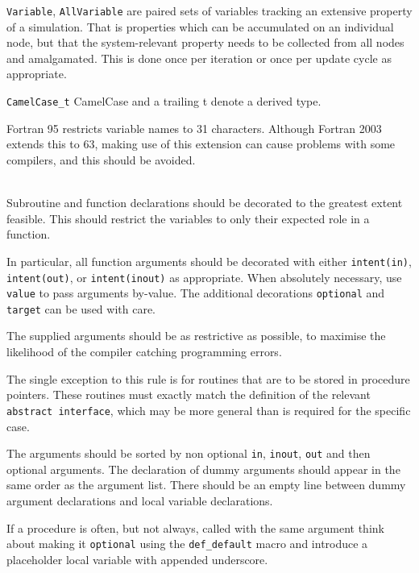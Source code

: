 \documentclass[a4paper,notitlepage,dvipsnames]{scrreprt}
\newenvironment{packed_itemize}{
	\begin{itemize}
		\setlength{\itemsep}{1pt}
		\setlength{\parskip}{0pt}
		\setlength{\parsep}{0pt}
	}{\end{itemize}}
\newcommand\headitem[1]{\needspace{1.5\baselineskip}\item[{\boldmath #1 \nopagebreak}] \hfill \\ \nopagebreak}
\let\code\lstinline
\begin{document}
\begin{description}
\begin{packed_itemize}
			\item
				\code{Variable}, \code{AllVariable} are paired sets of
				variables tracking an extensive property of a simulation. That
				is properties which can be accumulated on an individual node,
				but that the system-relevant property needs to be collected
				from all nodes and amalgamated. This is done once per iteration
				or once per update cycle as appropriate.
            \item
                \code{CamelCase_t} CamelCase and a trailing t
                denote a derived type.
		\end{packed_itemize}

		Fortran 95 restricts variable names to 31 characters. Although
		Fortran 2003 extends this to 63, making use of this extension can cause
		problems with some compilers, and this should be avoided.

	\headitem{Subroutine decoration (especially intent statements)}
		Subroutine and function declarations should be decorated to the
		greatest extent feasible. This should restrict the variables to only
		their expected role in a function.

		In particular, all function arguments should be decorated with either
		\code{intent(in)}, \code{intent(out)}, or
		\code{intent(inout)} as appropriate. When absolutely
                necessary, use \code{value} to pass arguments by-value. The additional decorations
		\code{optional} and \code{target} can be used with care.

		The supplied arguments should be as restrictive as possible, to
		maximise the likelihood of the compiler catching programming errors.

		The single exception to this rule is for routines that are to be
		stored in procedure pointers. These routines must exactly match the
		definition of the relevant \code{abstract interface}, which may
		be more general than is required for the specific case.

    The arguments should be sorted by non optional
    \code{in}, \code{inout}, \code{out} and then optional arguments.
    The declaration of dummy arguments should appear in the same
    order as the argument list.
    There should be an empty line between dummy argument declarations
    and local variable declarations.

    If a procedure is often, but not always, called with the same argument
    think about making it \code{optional} using the \code{def_default}
    macro and introduce a placeholder local variable with appended
    underscore.


\end{description}
\end{document}

